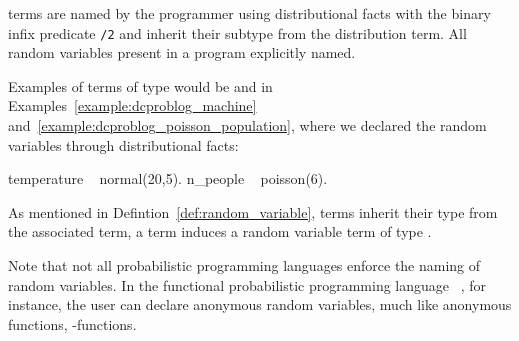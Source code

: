 


\begin{definition} \label{def:random_variable}
	 terms are named by the programmer using distributional facts with the binary infix predicate \probloginline{~}\lstinline[columns=fixed]|/2| and inherit their subtype from the distribution term. All random variables present in a \dcproblogsty program  explicitly named.
\end{definition}

Examples of terms of type  would be  and  in Examples~\ref{example:dcproblog_machine} and~\ref{example:dcproblog_poisson_population}, where we declared the random variables through distributional facts: 
\begin{problog}
temperature ~ normal(20,5).
n_people ~ poisson(6).
\end{problog}
As mentioned in Defintion~\ref{def:random_variable},  terms inherit their type from the associated  term, \eg a  term induces a random variable term of type .

Note that not all probabilistic programming languages enforce the naming of random variables. In the functional probabilistic programming language \anglicansty~\citep{wood2014approach}, for instance, the user can declare anonymous random variables, much like anonymous functions, \ie \textlambda-functions. 
 

